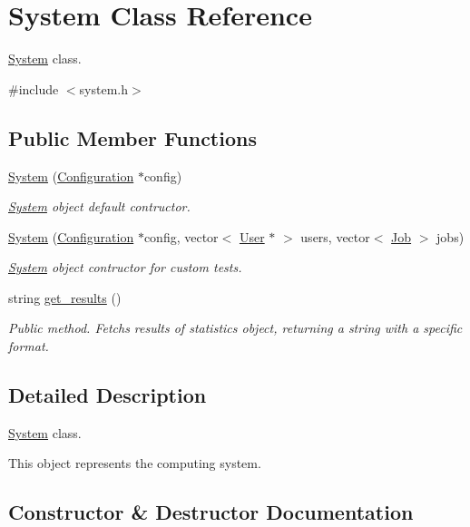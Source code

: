 \hypertarget{classSystem}{}\section{System Class Reference}
\label{classSystem}


\hyperlink{classSystem}{System} class.  




{\ttfamily \#include $<$system.\+h$>$}

\subsection*{Public Member Functions}
\begin{DoxyCompactItemize}
\item 
\hyperlink{classSystem_a38c393cf990b65c13bf926c6e25c4f0a}{System} (\hyperlink{classConfiguration}{Configuration} $\ast$config)
\begin{DoxyCompactList}\small\item\em \hyperlink{classSystem}{System} object default contructor. \end{DoxyCompactList}\item 
\hyperlink{classSystem_a4d2006a8a392e1c198fb988a7d125ac8}{System} (\hyperlink{classConfiguration}{Configuration} $\ast$config, vector$<$ \hyperlink{classUser}{User} $\ast$ $>$ users, vector$<$ \hyperlink{classJob}{Job} $>$ jobs)
\begin{DoxyCompactList}\small\item\em \hyperlink{classSystem}{System} object contructor for custom tests. \end{DoxyCompactList}\item 
string \hyperlink{classSystem_adbb7e0745a7a25f8a598eaa6b04dd4ed}{get\+\_\+results} ()
\begin{DoxyCompactList}\small\item\em Public method. Fetchs results of statistics object, returning a string with a specific format. \end{DoxyCompactList}\end{DoxyCompactItemize}


\subsection{Detailed Description}
\hyperlink{classSystem}{System} class. 

This object represents the computing system. 

\subsection{Constructor \& Destructor Documentation}
